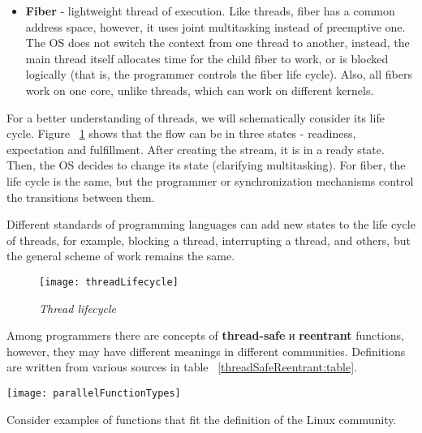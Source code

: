 {\begin{itemize}
			\item\textbf{Fiber} - lightweight thread of execution. Like threads, fiber has a common address space, however, it uses joint multitasking instead of preemptive one. The OS does not switch the context from one thread to another, instead, the main thread itself allocates time for the child fiber to work, or is blocked logically (that is, the programmer controls the fiber life cycle). Also, all fibers work on one core, unlike threads, which can work on different kernels.
		\end{itemize}
	\par For a better understanding of threads, we will schematically consider its life cycle. Figure ~\ref{threadLifecycle:image} shows that the flow can be in three states - readiness, expectation and fulfillment. After creating the stream, it is in a ready state. Then, the OS decides to change its state (clarifying multitasking). For fiber, the life cycle is the same, but the programmer or synchronization mechanisms control the transitions between them.
	\par Different standards of programming languages can add new states to the life cycle of threads, for example, blocking a thread, interrupting a thread, and others, but the general scheme of work remains the same.
		\begin{figure}[H]
			\texttt{[image: threadLifecycle]}
			\caption{\textit{Thread lifecycle}}
			\label{threadLifecycle:image}
		\end{figure}
	\par Among programmers there are concepts of \textbf{thread-safe} и \textbf{reentrant} functions, however, they may have different meanings in different communities. Definitions are written from various sources in table ~\ref{threadSafeReentrant:table}.
	\begin{table}[H]
		\caption{Definitions of thread-safe and reentrant functions}
		\label{threadSafeReentrant:table}
		\begin{center}
					\texttt{[image: parallelFunctionTypes]}
		\end{center}
	\end{table}
	\par Consider examples of functions that fit the definition of the Linux community.
}
